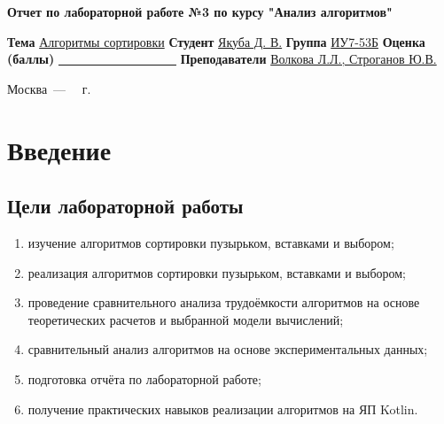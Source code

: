\documentclass[12pt]{report}
\begin{document}
\begin{titlepage}
	
	\begin{center}
		\Large\textbf{Отчет по лабораторной работе №3 по курсу "Анализ алгоритмов"}\newline
	\end{center}
	
	\noindent\textbf{Тема} \underline{Алгоритмы сортировки}\newline\newline\newline
	\noindent\textbf{Студент} \underline{Якуба Д. В.}\newline\newline
	\noindent\textbf{Группа} \underline{ИУ7-53Б}\newline\newline
	\noindent\textbf{Оценка (баллы)} \underline{~~~~~~~~~~~~~~~~~~~}\newline\newline
	\noindent\textbf{Преподаватели} \underline{Волкова Л.Л., Строганов Ю.В.}\newline
	
	\begin{center}
		\vfill
		Москва~---~\the\year
		~г.
	\end{center}
\end{titlepage}

\tableofcontents

\newpage
\chapter*{Введение}
\section*{Цели лабораторной работы}
\begin{enumerate}
\item изучение алгоритмов сортировки пузырьком, вставками и выбором;
\item реализация алгоритмов сортировки пузырьком, вставками и выбором;
\item проведение сравнительного анализа трудоёмкости алгоритмов на основе теоретических расчетов и выбранной модели вычислений;
\item сравнительный анализ алгоритмов на основе экспериментальных данных;
\item подготовка отчёта по лабораторной работе;
\item получение практических навыков реализации алгоритмов на ЯП Kotlin.
\end{enumerate}
\end{document}
